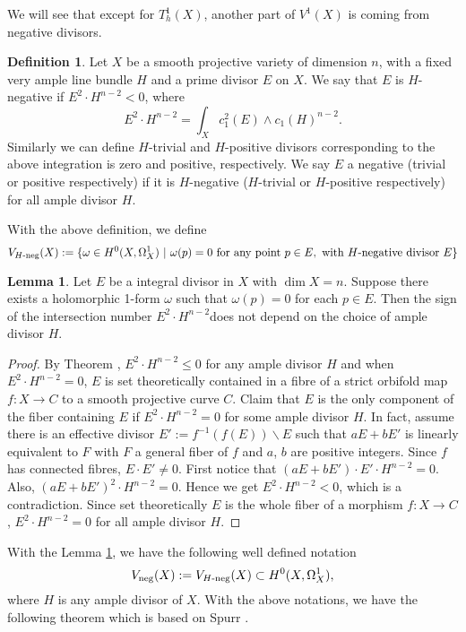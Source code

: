 \documentclass[a4paper,12pt,reqno]{amsart}
\theoremstyle{plain}
\theoremstyle{definition}
\newtheorem{definition}[theorem]{Definition}
\newtheorem{lemma}[theorem]{Lemma}
\theoremstyle{remark}
\begin{document}
We will see that except for $T_h^1(X)$, another part of $V^1(X)$ is coming from negative divisors.
\begin{definition}
Let $X$ be a smooth projective variety of dimension $n$, with a fixed very ample line bundle $H$ and a prime divisor $E$ on $X$. We say that $E$ is $H$-negative if $E^2\cdot H^{n-2}<0$, where $$E^2\cdot H^{n-2}=\int_X c_1^2(E)\wedge c_1(H)^{n-2}.$$ Similarly we can define $H$-trivial and $H$-positive divisors corresponding to the above integration is zero and positive, respectively. We say $E$ a negative (trivial or positive respectively) if it is $H$-negative ($H$-trivial or $H$-positive respectively) for all ample divisor $H$.
\end{definition}  
With the above definition, we define $$V_{H\textnormal{-neg}}(X):=\{\omega\in H^0(X, \Omega_X^1)\ |\ \omega(p)=0\  \textnormal{for any point}\ p\in E, \ \textnormal{with $H$-negative divisor}\  E\}$$  

\begin{lemma}\label{lem:welldef}
Let $E$ be a integral divisor in $X$ with $\dim X=n$. Suppose there exists a holomorphic 1-form $\omega$ such that $\omega(p)=0$ for each $p\in E$. Then the sign of the intersection number $E^2\cdot H^{n-2}$does not depend on the choice of ample divisor $H$.
\end{lemma}

\begin{proof}
By Theorem \cite[Theorem 2]{Sp88}, $E^2\cdot H^{n-2}\leq 0$ for any ample divisor $H$ and when $E^2\cdot H^{n-2}=0$, $E$ is set theoretically contained in a fibre of a strict orbifold map $f: X\to C$ to a smooth projective curve $C$.  Claim that $E$ is the only component of the fiber containing $E$ if $E^2\cdot H^{n-2}=0$ for some ample divisor $H$. In fact, assume there is an effective divisor $E':=f^{-1}(f(E))\backslash E$ such that $aE+bE'$ is linearly equivalent to $F$ with $F$ a general fiber of $f$ and $a$, $b$ are positive integers. Since $f$ has connected fibres, $E\cdot E'\not=0$.  First notice that $(aE+bE')\cdot E'\cdot H^{n-2}=0$. Also, $(aE+bE')^2\cdot H^{n-2}=0$. Hence we get $E^2\cdot H^{n-2}<0$, which is a contradiction. Since set theoretically $E$ is the whole fiber of a morphism $f: X\to C$, $E^2\cdot H^{n-2}=0$ for all ample divisor $H$. 
\end{proof}


With the Lemma \ref{lem:welldef}, we have the following well defined notation$$V_{\textnormal{neg}}(X):=V_{H\textnormal{-neg}}(X)\subset H^0(X, \Omega_X^1),$$ where $H$ is any ample divisor of $X$. With the above notations, we have the following theorem which is based on Spurr \cite[Theorem 2]{Sp88}.
\end{document}
